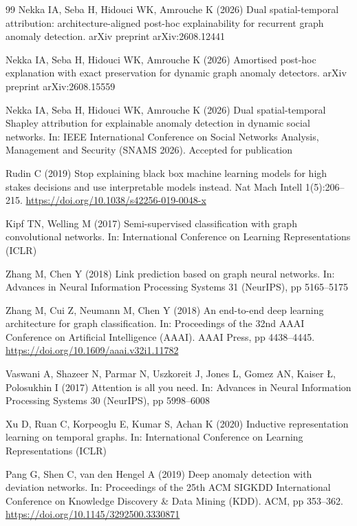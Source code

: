 \documentclass[pdflatex,sn-basic]{sn-jnl}
\theoremstyle{definition}
\theoremstyle{plain}
\begin{document}
\begin{thebibliography}{99}
Nekka IA, Seba H, Hidouci WK, Amrouche K (2026) Dual spatial-temporal attribution: architecture-aligned post-hoc explainability for recurrent graph anomaly detection. arXiv preprint arXiv:2608.12441

Nekka IA, Seba H, Hidouci WK, Amrouche K (2026) Amortised post-hoc explanation with exact preservation for dynamic graph anomaly detectors. arXiv preprint arXiv:2608.15559

Nekka IA, Seba H, Hidouci WK, Amrouche K (2026) Dual spatial-temporal Shapley attribution for explainable anomaly detection in dynamic social networks. In: IEEE International Conference on Social Networks Analysis, Management and Security (SNAMS 2026). Accepted for publication

Rudin C (2019) Stop explaining black box machine learning models for high stakes decisions and use interpretable models instead. Nat Mach Intell 1(5):206--215. \url{https://doi.org/10.1038/s42256-019-0048-x}

Kipf TN, Welling M (2017) Semi-supervised classification with graph convolutional networks. In: International Conference on Learning Representations (ICLR)

Zhang M, Chen Y (2018) Link prediction based on graph neural networks. In: Advances in Neural Information Processing Systems 31 (NeurIPS), pp 5165--5175

Zhang M, Cui Z, Neumann M, Chen Y (2018) An end-to-end deep learning architecture for graph classification. In: Proceedings of the 32nd AAAI Conference on Artificial Intelligence (AAAI). AAAI Press, pp 4438--4445. \url{https://doi.org/10.1609/aaai.v32i1.11782}

Vaswani A, Shazeer N, Parmar N, Uszkoreit J, Jones L, Gomez AN, Kaiser {\L}, Polosukhin I (2017) Attention is all you need. In: Advances in Neural Information Processing Systems 30 (NeurIPS), pp 5998--6008

Xu D, Ruan C, Korpeoglu E, Kumar S, Achan K (2020) Inductive representation learning on temporal graphs. In: International Conference on Learning Representations (ICLR)

Pang G, Shen C, van den Hengel A (2019) Deep anomaly detection with deviation networks. In: Proceedings of the 25th ACM SIGKDD International Conference on Knowledge Discovery \& Data Mining (KDD). ACM, pp 353--362. \url{https://doi.org/10.1145/3292500.3330871}


\end{thebibliography}
\end{document}
